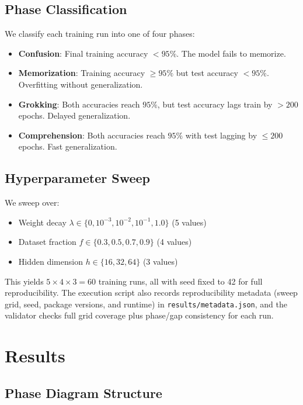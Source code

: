 \documentclass[11pt,a4paper]{article}
\begin{document}
\subsection{Phase Classification}

We classify each training run into one of four phases:
\begin{itemize}
  \item \textbf{Confusion}: Final training accuracy $< 95\%$. The model fails to memorize.
  \item \textbf{Memorization}: Training accuracy $\geq 95\%$ but test accuracy $< 95\%$. Overfitting without generalization.
  \item \textbf{Grokking}: Both accuracies reach $95\%$, but test accuracy lags train by $> 200$ epochs. Delayed generalization.
  \item \textbf{Comprehension}: Both accuracies reach $95\%$ with test lagging by $\leq 200$ epochs. Fast generalization.
\end{itemize}

\subsection{Hyperparameter Sweep}

We sweep over:
\begin{itemize}
  \item Weight decay $\lambda \in \{0, 10^{-3}, 10^{-2}, 10^{-1}, 1.0\}$ (5 values)
  \item Dataset fraction $f \in \{0.3, 0.5, 0.7, 0.9\}$ (4 values)
  \item Hidden dimension $h \in \{16, 32, 64\}$ (3 values)
\end{itemize}

This yields $5 \times 4 \times 3 = 60$ training runs, all with seed fixed to 42 for full reproducibility.
The execution script also records reproducibility metadata (sweep grid, seed, package versions, and runtime) in \texttt{results/metadata.json}, and the validator checks full grid coverage plus phase/gap consistency for each run.

\section{Results}

\subsection{Phase Diagram Structure}
\end{document}
